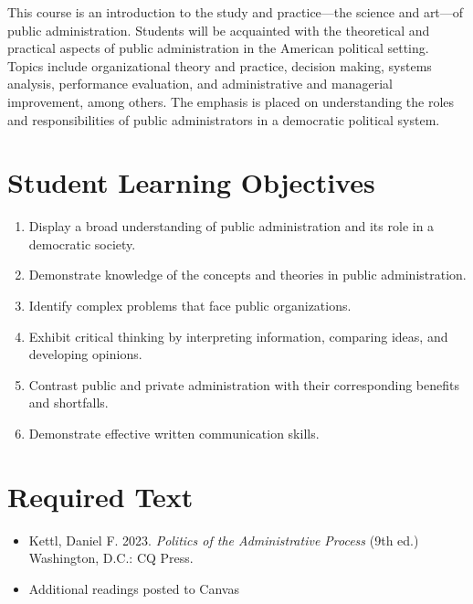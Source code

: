 \documentclass[11pt, letterpaper]{article}
\begin{document}
\vspace*{1em}

\noindent This course is an introduction to the study and practice---the science and art---of public administration. Students will be acquainted with the theoretical and practical aspects of public administration in the American political setting. Topics include organizational theory and practice, decision making, systems analysis, performance evaluation, and administrative and managerial improvement, among others. The emphasis is placed on understanding the roles and responsibilities of public administrators in a democratic political system. 
	

\section*{Student Learning Objectives}

\begin{enumerate}
    \item Display a broad understanding of public administration and its role in a democratic society. 

    \item Demonstrate knowledge of the concepts and theories in public administration. 
    
    \item Identify complex problems that face public organizations.

    \item Exhibit critical thinking by interpreting information, comparing ideas, and developing opinions. 
    
    \item Contrast public and private administration with their corresponding benefits and shortfalls. 

    \item Demonstrate effective written communication skills. 

\end{enumerate}

\section*{Required Text}

\begin{itemize}
    \item Kettl, Daniel F. 2023. \emph{Politics of the Administrative Process} (9th ed.) Washington, D.C.: CQ Press.
    \item Additional readings posted to Canvas
\end{itemize}
\end{document}
